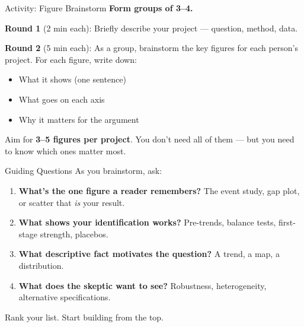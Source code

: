 \begin{frame}{Activity: Figure Brainstorm}
  \textbf{Form groups of 3--4.}

  \vspace{8pt}

  \textbf{Round 1} (2 min each): Briefly describe your project --- question, method, data.

  \vspace{4pt}

  \textbf{Round 2} (5 min each): As a group, brainstorm the key figures for each person's project. For each figure, write down:
  \begin{itemize}
    \item What it shows (one sentence)
    \item What goes on each axis
    \item Why it matters for the argument
  \end{itemize}

  \vspace{8pt}

  Aim for \textbf{3--5 figures per project}. You don't need all of them --- but you need to know which ones matter most.
\end{frame}

\begin{frame}{Guiding Questions}
  As you brainstorm, ask:

  \vspace{6pt}

  \begin{enumerate}
    \item \textbf{What's the one figure a reader remembers?} The event study, gap plot, or scatter that \emph{is} your result.

    \vspace{3pt}

    \item \textbf{What shows your identification works?} Pre-trends, balance tests, first-stage strength, placebos.

    \vspace{3pt}

    \item \textbf{What descriptive fact motivates the question?} A trend, a map, a distribution.

    \vspace{3pt}

    \item \textbf{What does the skeptic want to see?} Robustness, heterogeneity, alternative specifications.
  \end{enumerate}

  \vspace{6pt}

  Rank your list. Start building from the top.
\end{frame}

